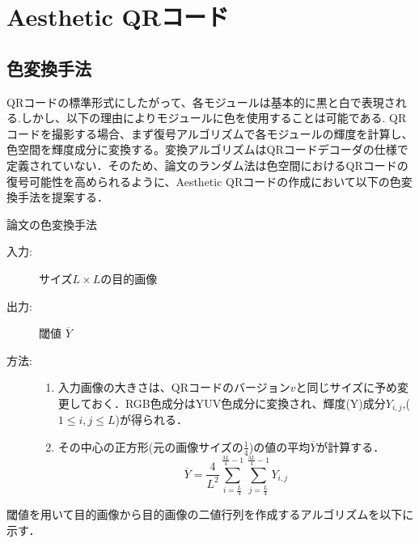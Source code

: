 \documentclass{thesis}
\begin{document}
\chapter{Aesthetic QRコード}

\section{色変換手法}
QRコードの標準形式にしたがって、各モジュールは基本的に黒と白で表現される.しかし、以下の理由によりモジュールに色を使用することは可能である.
QRコードを撮影する場合、まず復号アルゴリズムで各モジュールの輝度を計算し、色空間を輝度成分に変換する。変換アルゴリズムはQRコードデコーダの仕様で定義されていない．そのため、論文\cite{KURI}のランダム法は色空間におけるQRコードの復号可能性を高められるように、Aesthetic QRコードの作成において以下の色変換手法を提案する．

\begin{algorithm}                      
\caption{論文\cite{KURI}の色変換手法}         
\label{alg:alg1} 
\begin{description}
\item[入力:] サイズ$L \times L$の目的画像
\item[出力:] 閾値 $\overline{Y}$
\item[方法:]
\begin{enumerate}
\item 入力画像の大きさは、QRコードのバージョン$v$と同じサイズに予め変更しておく．RGB色成分はYUV色成分に変換され、輝度(Y)成分$Y_{i,j}$,($1 \leq i,j \leq L$)が得られる．
\item その中心の正方形(元の画像サイズの$\frac{1}{4}$)の値の平均$\overline{Y}$が計算する．
\begin{equation}
\overline{Y} = \frac{4}{L^2} \sum_{i = \frac{L}{4}}^{\frac{3L}{4} - 1} \sum_{j = \frac{L}{4}}^{\frac{3L}{4} - 1} Y_{i,j}
\label{eq:pol4}
\end{equation}
\end{enumerate}
\end{description}
\end{algorithm}  


閾値を用いて目的画像から目的画像の二値行列を作成するアルゴリズムを以下に示す．
\end{document}
